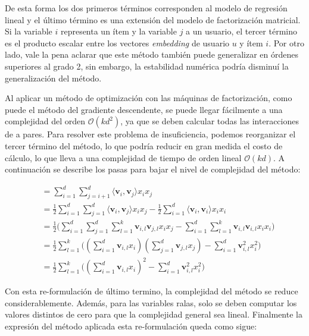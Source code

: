 \documentclass[11pt,a4paper,twoside]{thesis}
\begin{document}
De esta forma los dos primeros términos corresponden al modelo de regresión
lineal y el último término es una extensión del modelo de factorización
matricial. Si la variable $i$ representa un ítem y la variable $j$ a un
usuario, el tercer término es el producto escalar entre los vectores
\textit{embedding} de usuario $u$ y ítem $i$. Por otro lado, vale la pena
aclarar que este método también puede generalizar en órdenes superiores al
grado 2, sin embargo, la estabilidad numérica podría disminuí la generalización
del método.

Al aplicar un método de optimización con las máquinas de factorización, como
puede el método del gradiente descendente, se puede llegar fácilmente a una
complejidad del orden $\mathcal{O}(kd^2)$, ya que se deben calcular todas las
interacciones de a pares. Para resolver este problema de insuficiencia, podemos
reorganizar el tercer término del método, lo que podría reducir en gran medida
el costo de cálculo, lo que lleva a una complejidad de tiempo de orden lineal
$\mathcal{O}(kd)$. A continuación se describe los pasas para bajar el nivel de
complejidad del método:

\begin{equation}
	\begin{split}
		&=\sum_{i=1}^d \sum_{j=i+1}^d \langle\mathbf{v}_i, \mathbf{v}_j\rangle x_i x_j \\
		&= \frac{1}{2} \sum_{i=1}^d \sum_{j=1}^d\langle\mathbf{v}_i, \mathbf{v}_j\rangle x_i x_j - \frac{1}{2}\sum_{i=1}^d \langle\mathbf{v}_i, \mathbf{v}_i\rangle x_i x_i \\
		&= \frac{1}{2} \big (\sum_{i=1}^d \sum_{j=1}^d \sum_{l=1}^k\mathbf{v}_{i, l} \mathbf{v}_{j, l} x_i x_j - \sum_{i=1}^d \sum_{l=1}^k \mathbf{v}_{i, l} \mathbf{v}_{i, l} x_i x_i \big)\\
		&=  \frac{1}{2} \sum_{l=1}^k \big ((\sum_{i=1}^d \mathbf{v}_{i, l} x_i) (\sum_{j=1}^d \mathbf{v}_{j, l}x_j) - \sum_{i=1}^d \mathbf{v}_{i, l}^2 x_i^2 \big ) \\
		&= \frac{1}{2} \sum_{l=1}^k \big ((\sum_{i=1}^d \mathbf{v}_{i, l} x_i)^2 - \sum_{i=1}^d \mathbf{v}_{i, l}^2 x_i^2)
	\end{split}
\end{equation}

Con esta re-formulación de último termino, la complejidad del método se reduce
considerablemente. Además, para las variables ralas, solo se deben computar los
valores distintos de cero para que la complejidad general sea lineal.
Finalmente la expresión del método aplicada esta re-formulación queda como
sigue:
\end{document}
